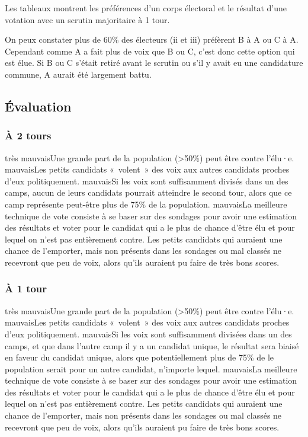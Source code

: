 \documentclass[../report]{subfiles}
\begin{document}
  Les tableaux  montrent les préférences d'un corps 
  électoral et le résultat d'une votation avec un scrutin majoritaire à 1 tour.

  On peux constater plus de 60\% des électeurs (ii et iii) préfèrent B à A ou C à A. 
  Cependant comme A a fait plus de voix que B ou C, c'est donc cette option qui est élue.
  Si B ou C s'était retiré avant le scrutin ou s'il y avait eu une candidature commune, A aurait été largement battu. 

  \subsection{Évaluation}
  \subsubsection{À 2 tours}
  \tabcritere%
    {très mauvais}{Une grande part de la population (>50\%) peut être contre l'élu·e.}%
    {mauvais}{Les petits candidats «~volent~» des voix aux autres candidats proches d'eux politiquement.}%
    {mauvais}{Si les voix sont suffisamment divisés dans un des camps, aucun de leurs candidats pourrait atteindre le second tour, alors que ce camp représente peut-être plus de 75\% de la population.}%
    {mauvais}{La meilleure technique de vote consiste à se baser sur des sondages pour avoir une estimation des résultats et voter pour le candidat qui a le plus de chance d'être élu et pour lequel on n'est pas entièrement contre. Les petits candidats qui auraient une chance de l'emporter, mais non présents dans les sondages ou mal classés ne recevront que peu de voix, alors qu'ils auraient pu faire de très bons scores.}

  \subsubsection{À 1 tour}
  \tabcritere%
    {très mauvais}{Une grande part de la population (>50\%) peut être contre l'élu·e.}%
    {mauvais}{Les petits candidats «~volent~» des voix aux autres candidats proches d'eux politiquement.}%
    {mauvais}{Si les voix sont suffisamment divisées dans un des camps, et que dans l'autre camp il y a un candidat unique, le résultat sera biaisé en faveur du candidat unique, alors que potentiellement plus de 75\% de le population serait pour un autre candidat, n'importe lequel.}%
    {mauvais}{La meilleure technique de vote consiste à se baser sur des sondages pour avoir une estimation des résultats et voter pour le candidat qui a le plus de chance d'être élu et pour lequel on n'est pas entièrement contre. Les petits candidats qui auraient une chance de l'emporter, mais non présents dans les sondages ou mal classés ne recevront que peu de voix, alors qu'ils auraient pu faire de très bons scores.}
\end{document}
